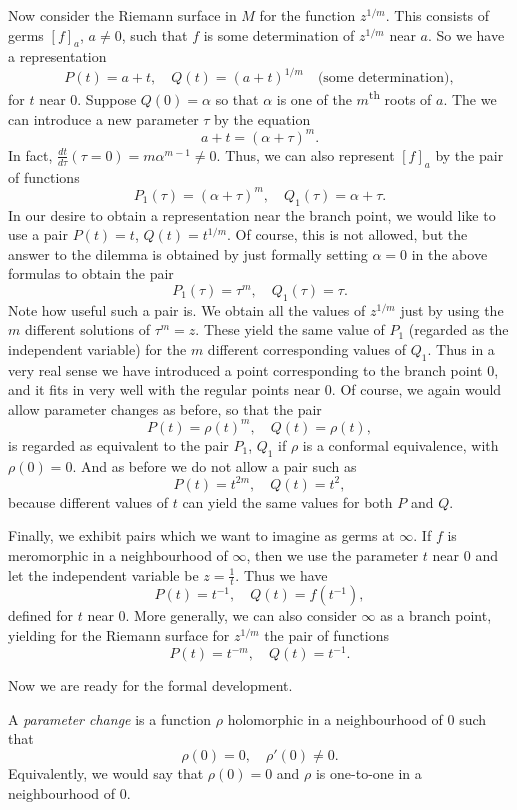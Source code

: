 \documentclass[a4paper,11pt]{article}
\begin{document}
Now consider the Riemann surface in $M$ for the function $z^{1/m}$.
This consists of germs $[f]_a$, $a\ne 0$, such that $f$ is some
determination of $z^{1/m}$ near $a$.  So we have a representation
$$
P(t) = a + t,\quad
Q(t) = (a+t)^{1/m}\quad \text{(some determination)},
$$
for $t$ near 0.  Suppose $Q(0) = \alpha$ so that $\alpha$ is one of
the $m$\textsuperscript{th} roots of $a$.  The we can introduce a new
parameter $\tau$ by the equation
$$
a + t = (\alpha + \tau)^m.
$$
In fact, $\frac{dt}{d\tau}(\tau=0) = m\alpha^{m-1} \ne 0$.  Thus, we
can also represent $[f]_a$ by the pair of functions
$$
P_1(\tau) = (\alpha + \tau)^m,\quad
Q_1(\tau) = \alpha + \tau.
$$
In our desire to obtain a representation near the branch point, we
would like to use a pair $P(t) = t$, $Q(t) = t^{1/m}$.  Of course,
this is not allowed, but the answer to the dilemma is obtained by just
formally setting $\alpha = 0$ in the above formulas to obtain the pair
$$
P_1(\tau) = \tau^m,\quad
Q_1(\tau) = \tau.
$$
Note how useful such a pair is.  We obtain all the values of $z^{1/m}$
just by using the $m$ different solutions of $\tau^m = z$.  These
yield the same value of $P_1$ (regarded as the independent variable)
for the $m$ different corresponding values of $Q_1$.  Thus in a very
real sense we have introduced a point corresponding to the branch
point 0, and it fits in very well with the regular points near 0.  
Of course, we again would allow parameter changes as before, so that
the pair
$$
P(t) = \rho(t)^m,\quad
Q(t) = \rho(t),
$$
is regarded as equivalent to the pair $P_1$, $Q_1$ if $\rho$ is a
conformal equivalence, with $\rho(0) = 0$.  And as before we do not
allow a pair such as
$$
P(t) = t^{2m},\quad
Q(t) = t^2,
$$
because different values of $t$ can yield the same values for both $P$
and $Q$.

Finally, we exhibit pairs which we want to imagine as germs at
$\infty$.  If $f$ is meromorphic in a neighbourhood of $\infty$, then
we use the parameter $t$ near 0 and let  the independent variable be
$z = \frac{1}{t}$.  Thus we have
$$
P(t) = t^{-1},\quad Q(t) = f(t^{-1}),
$$
defined for $t$ near 0.  More generally, we can also
consider $\infty$ as a branch point, yielding for the Riemann surface
for $z^{1/m}$ the pair of functions
$$
P(t) = t^{-m},\quad
Q(t) = t^{-1}.
$$

Now we are ready for the formal development.

\begin{defn}
  \label{def:1}
  A \emph{parameter change} is a function $\rho$ holomorphic in a
  neighbourhood of 0 such that
  $$
  \rho(0) = 0,\quad
  \rho'(0) \ne 0.
  $$
  Equivalently, we would say that $\rho(0) = 0$ and $\rho$ is
  one-to-one in a neighbourhood of 0.
\end{defn}
\end{document}
